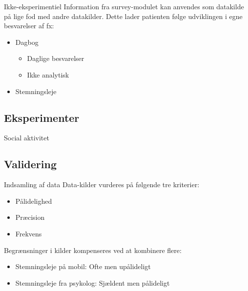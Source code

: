 \begin{frame}{Ikke-eksperimentiel}
Information fra survey-modulet kan anvendes som datakilde på lige fod med andre datakilder.
Dette lader patienten følge udviklingen i egne besvarelser af fx:
\begin{itemize}
\pause
\item Dagbog
\begin{itemize}
\item Daglige besvarelser
\item Ikke analytisk
\end{itemize}
\pause
\item Stemningsleje\\

\mygraph{\gstem{}}
\end{itemize}
\end{frame}

\subsection{Eksperimenter}

\begin{frame}{Social aktivitet}
\end{frame}

\subsection{Validering}
\begin{frame}{Indsamling af data}
Data-kilder vurderes på følgende tre kriterier:
\begin{itemize}
\item Pålidelighed
\item Præcision
\item Frekvens
\end{itemize}\pause
Begrænsninger i kilder kompenseres ved at kombinere flere:
\begin{itemize}
\item Stemningsleje på mobil: Ofte men upålideligt
\item Stemningsleje fra psykolog: Sjældent men pålideligt
\end{itemize}
\end{frame}

